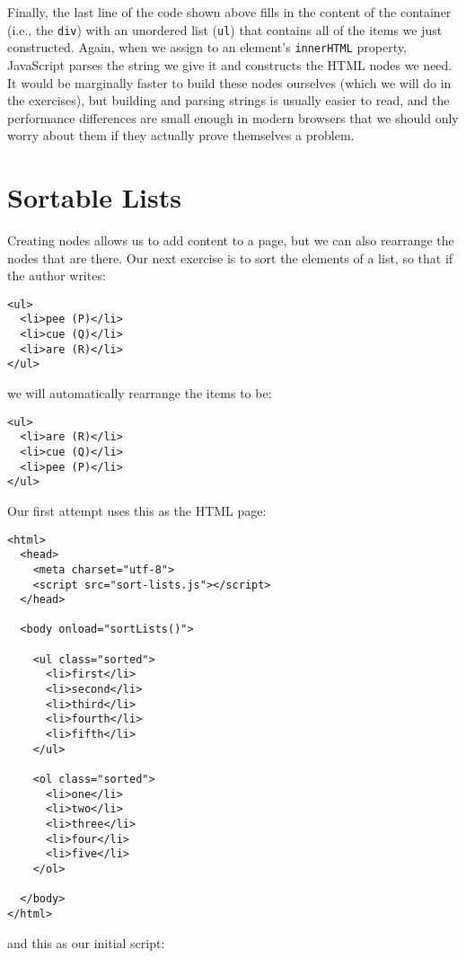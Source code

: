 Finally,
the last line of the code shown above
fills in the content of the container (i.e., the \texttt{div})
with an unordered list (\texttt{ul})
that contains all of the items we just constructed.
Again,
when we assign to an element's \texttt{innerHTML} property,
JavaScript parses the string we give it
and constructs the HTML nodes we need.
It would be marginally faster to build these nodes ourselves
(which we will do in the exercises),
but building and parsing strings is usually easier to read,
and the performance differences are small enough in modern browsers
that we should only worry about them if they actually prove themselves a problem.

\section{Sortable Lists}\label{s:pages-sort-list}

Creating nodes allows us to add content to a page,
but we can also rearrange the nodes that are there.
Our next exercise is to sort the elements of a list,
so that if the author writes:

\begin{verbatim}
<ul>
  <li>pee (P)</li>
  <li>cue (Q)</li>
  <li>are (R)</li>
</ul>
\end{verbatim}

\noindent
we will automatically rearrange the items to be:

\begin{verbatim}
<ul>
  <li>are (R)</li>
  <li>cue (Q)</li>
  <li>pee (P)</li>
</ul>
\end{verbatim}

Our first attempt uses this as the HTML page:

\begin{verbatim}
<html>
  <head>
    <meta charset="utf-8">
    <script src="sort-lists.js"></script>
  </head>

  <body onload="sortLists()">

    <ul class="sorted">
      <li>first</li>
      <li>second</li>
      <li>third</li>
      <li>fourth</li>
      <li>fifth</li>
    </ul>

    <ol class="sorted">
      <li>one</li>
      <li>two</li>
      <li>three</li>
      <li>four</li>
      <li>five</li>
    </ol>

  </body>
</html>
\end{verbatim}

\noindent
and this as our initial script:

